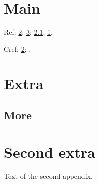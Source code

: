 \documentclass{article}
\begin{document}
\section{Main}\label{main}
Ref: \ref{app:a}; \ref{app:b}; \ref{sub:a}; \ref{main}.

Cref: \cref{app:a}; .
\appendix
\section{Extra}\label{app:a}
\subsection{More}\label{sub:a}
\section{Second extra}\label{app:b}
Text of the second appendix.
\end{document}
